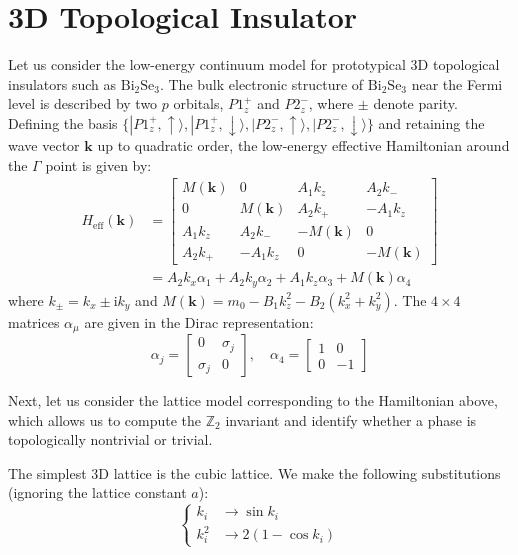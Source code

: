 \section{3D Topological Insulator}

Let us consider the low-energy continuum model for prototypical 3D topological insulators such as $\mathrm{Bi}_2\mathrm{Se}_3$. The bulk electronic structure of $\mathrm{Bi}_2\mathrm{Se}_3$ near the Fermi level is described by two $p$ orbitals, $P1_z^+$ and $P2_z^-$, where $\pm$ denote parity. Defining the basis $\{ |P1_z^+, \uparrow \rangle, |P1_z^+, \downarrow \rangle, |P2_z^-, \uparrow \rangle, |P2_z^-, \downarrow \rangle \}$ and retaining the wave vector $\bm{k}$ up to quadratic order, the low-energy effective Hamiltonian around the $\Gamma$ point is given by:
\begin{equation}
    \begin{aligned}
    H_{\mathrm{eff}}(\bm{k}) &= 
    \begin{bmatrix} 
    M(\bm{k}) & 0 & A_1 k_z & A_2 k_- \\ 
    0 & M(\bm{k}) & A_2 k_+ & -A_1 k_z \\ 
    A_1 k_z & A_2 k_- & -M(\bm{k}) & 0 \\ 
    A_2 k_+ & -A_1 k_z & 0 & -M(\bm{k}) 
    \end{bmatrix}\\
    &= A_2 k_x \alpha_1 + A_2 k_y \alpha_2 + A_1 k_z \alpha_3 + M(\bm{k}) \alpha_4
\end{aligned}
\end{equation}
where $k_\pm = k_x \pm \mathrm{i} k_y$ and $M(\bm{k}) = m_0 - B_1 k_z^2 - B_2(k_x^2 + k_y^2)$. The $4 \times 4$ matrices $\alpha_\mu$ are given in the Dirac representation:
\begin{equation}
\alpha_j = \begin{bmatrix} 0 & \sigma_j \\ \sigma_j & 0 \end{bmatrix} , \quad \alpha_4 = \begin{bmatrix} 1 & 0 \\ 0 & -1 \end{bmatrix}
\end{equation}

Next, let us consider the lattice model corresponding to the Hamiltonian above, which allows us to compute the $\mathbb{Z}_2$ invariant and identify whether a phase is topologically nontrivial or trivial.

The simplest 3D lattice is the cubic lattice. We make the following substitutions (ignoring the lattice constant $a$):
\begin{equation}
\left\{
\begin{aligned}
k_i &\to \sin k_i \\
k_i^2 &\to 2(1 - \cos k_i)
\end{aligned}
\right.
\end{equation}

